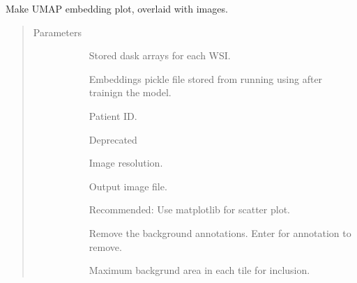 \documentclass[letterpaper,10pt,english]{sphinxmanual}
\begin{document}

\begin{fulllineitems}
\label{\detokenize{index:pathflowai.visualize.plot_umap_images}}
Make UMAP embedding plot, overlaid with images.
\begin{quote}\begin{description}
\item[{Parameters}] \leavevmode\begin{description}
\item[{}] \leavevmode
Stored dask arrays for each WSI.

\item[{}] \leavevmode
Embeddings pickle file stored from running using after trainign the model.

\item[{}] \leavevmode
Patient ID.

\item[{}] \leavevmode
Deprecated

\item[{}] \leavevmode
Image resolution.

\item[{}] \leavevmode
Output image file.

\item[{}] \leavevmode
Recommended: Use matplotlib for scatter plot.

\item[{}] \leavevmode
Remove the background annotations. Enter for annotation to remove.

\item[{}] \leavevmode
Maximum backgrund area in each tile for inclusion.


\end{description}
\end{description}
\end{quote}
\end{fulllineitems}
\end{document}
